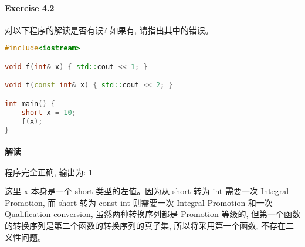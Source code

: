 \documentclass{article}
\begin{document}
	\paragraph*{Exercise 4.2} 
	
	对以下程序的解读是否有误?	如果有, 请指出其中的错误。
	
	\begin{lstlisting}[language=C++]  		
#include<iostream>

void f(int& x) { std::cout << 1; }

void f(const int& x) { std::cout << 2; }

int main() {
	short x = 10;
	f(x);
}
	\end{lstlisting}
	
	
	\paragraph*{解读} $\boxed{\text{程序完全正确, 输出为: 1}} $
	
	这里 x 本身是一个 short 类型的左值。因为从 short 转为 int 需要一次 Integral Promotion, 而 short 转为 const int 则需要一次 Integral Promotion 和一次 Qualification conversion, 虽然两种转换序列都是 Promotion 等级的, 但第一个函数的转换序列是第二个函数的转换序列的真子集, 所以将采用第一个函数, 不存在二义性问题。
\end{document}
